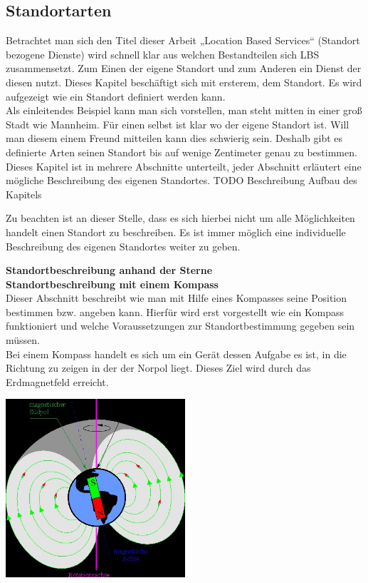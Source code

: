 \subsection{Standortarten}
Betrachtet man sich den Titel dieser Arbeit „Location Based Services“ (Standort bezogene Dienste) wird schnell klar aus welchen Bestandteilen sich LBS zusammensetzt. Zum Einen der eigene Standort und zum Anderen ein Dienst der diesen nutzt. Dieses Kapitel beschäftigt sich mit ersterem, dem Standort. Es wird aufgezeigt wie ein Standort definiert werden kann.
\\Als einleitendes Beispiel kann man sich vorstellen, man steht mitten in einer groß Stadt wie Mannheim. Für einen selbst ist klar wo der eigene Standort ist. Will man diesem einem Freund mitteilen kann dies schwierig sein. Deshalb gibt es definierte Arten seinen Standort bis auf wenige Zentimeter genau zu bestimmen. Dieses Kapitel ist in mehrere Abschnitte unterteilt, jeder Abschnitt erläutert eine mögliche Beschreibung des eigenen Standortes.
TODO Beschreibung Aufbau des Kapitels

Zu beachten ist an dieser Stelle, dass es sich hierbei nicht um alle Möglichkeiten handelt einen Standort zu beschreiben. Es ist immer möglich eine individuelle Beschreibung des eigenen Standortes weiter zu geben. 

\textbf{Standortbeschreibung anhand der Sterne}\\
\textbf{Standortbeschreibung mit einem Kompass}
\\Dieser Abschnitt beschreibt wie man mit Hilfe eines Kompasses seine Position bestimmen bzw. angeben kann. Hierfür wird erst vorgestellt wie ein Kompass funktioniert und welche Voraussetzungen zur Standortbestimmung gegeben sein müssen.
\\Bei einem Kompass handelt es sich um ein Gerät dessen Aufgabe es ist, in die Richtung zu zeigen in der der Norpol liegt. Dieses Ziel wird durch das Erdmagnetfeld erreicht.

\includegraphics[width=0.50\textwidth]{ref/images/magnetfeld.jpg}
 
